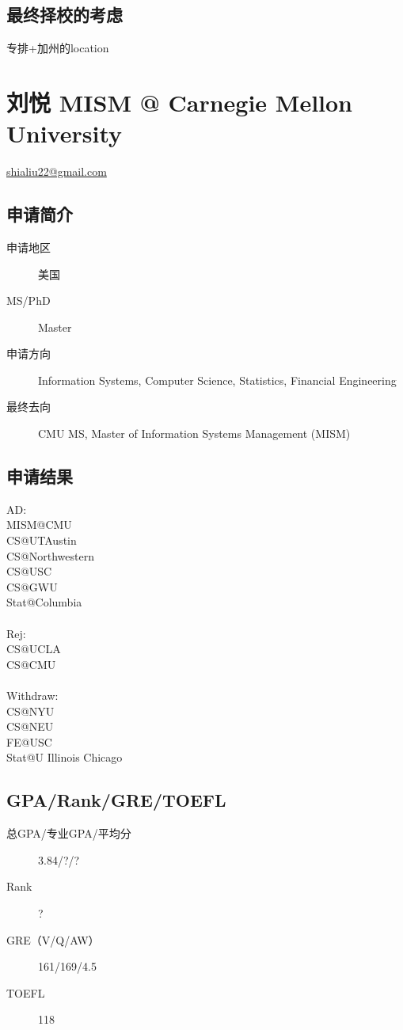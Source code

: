 \documentclass[11pt,fleqn,openany]{book} %
\begin{document}
\subsection*{最终择校的考虑}
专排+加州的location
\clearpage
\section{刘悦 MISM @ Carnegie Mellon University}
\hfill \href{mailto:shialiu22@gmail.com}{shialiu22@gmail.com}

\noindent\begin{minipage}[t]{0.45\textwidth}
\subsection*{申请简介}
\begin{description}
\item[申请地区] 美国
\item[MS/PhD] Master
\item[申请方向] Information Systems, Computer Science, Statistics, Financial Engineering
\item[最终去向] CMU MS, Master of Information Systems Management (MISM)
\end{description}
\end{minipage}
\hfill
\begin{minipage}[t]{0.45\textwidth}
\subsection*{申请结果}
\noindent AD:\\
MISM@CMU\\
CS@UTAustin\\
CS@Northwestern\\
CS@USC\\
CS@GWU\\
Stat@Columbia\\
\\
Rej:\\
CS@UCLA\\
CS@CMU\\
\\
Withdraw:\\
CS@NYU\\
CS@NEU\\
FE@USC\\
Stat@U Illinois Chicago
\end{minipage}
\subsection*{GPA/Rank/GRE/TOEFL}
\begin{description}
\item[总GPA/专业GPA/平均分] 3.84/?/?
\item[Rank] ?
\item[GRE（V/Q/AW）] 161/169/4.5
\item[TOEFL] 118
\end{description}
\end{document}
